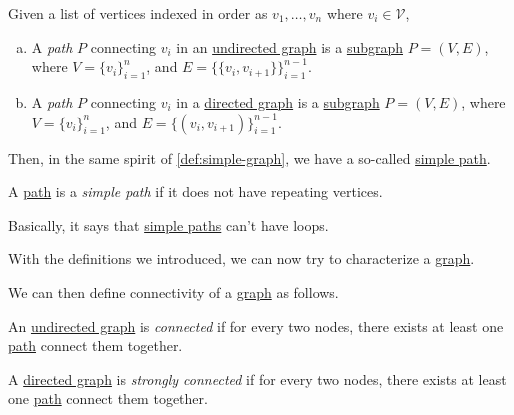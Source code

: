 \begin{definition}[Path]\label{def:path}
	Given a list of vertices indexed in order as \(v_1, \dots , v_n\) where \(v_i\in \mathcal{V} \),
	\begin{enumerate}[(a)]
		\item A \emph{path} \(P\) connecting \(v_i\) in an \hyperref[def:undirected-graph]{undirected graph} is a \hyperref[def:subgraph]{subgraph} \(P = (V, E)\), where \(V=\{v_i\}_{i=1}^n\), and \(E = \{\{v_i, v_{i+1}\}\}_{i = 1}^{n-1}\).
		\item A \emph{path} \(P\) connecting \(v_i\) in a \hyperref[def:directed-graph]{directed graph} is a \hyperref[def:subgraph]{subgraph} \(P = (V, E)\), where \(V=\{v_i\}_{i=1}^n\), and \(E = \{(v_i, v_{i+1})\}_{i = 1}^{n-1}\).
	\end{enumerate}
\end{definition}

Then, in the same spirit of \autoref{def:simple-graph}, we have a so-called \hyperref[def:simple-path]{simple path}.
\begin{definition}\label{def:simple-path}
	A \hyperref[def:path]{path} is a \emph{simple path} if it does not have repeating vertices.
\end{definition}
\begin{intuition}
	Basically, it says that \hyperref[def:simple-path]{simple paths} can't have loops.
\end{intuition}

With the definitions we introduced, we can now try to characterize a \hyperref[def:graph]{graph}.

\begin{definition*}
	We can then define connectivity of a \hyperref[def:graph]{graph} as follows.
	\begin{definition}[Connected]\label{def:connected}
		An \hyperref[def:undirected-graph]{undirected graph} is \emph{connected} if for every two nodes, there exists at least one \hyperref[def:path]{path} connect them together.
	\end{definition}

	\begin{definition}\label{def:strongly-connected}
		A \hyperref[def:directed-graph]{directed graph} is \emph{strongly connected} if for every two nodes, there exists at least one \hyperref[def:path]{path} connect them together.
	\end{definition}
\end{definition*}

